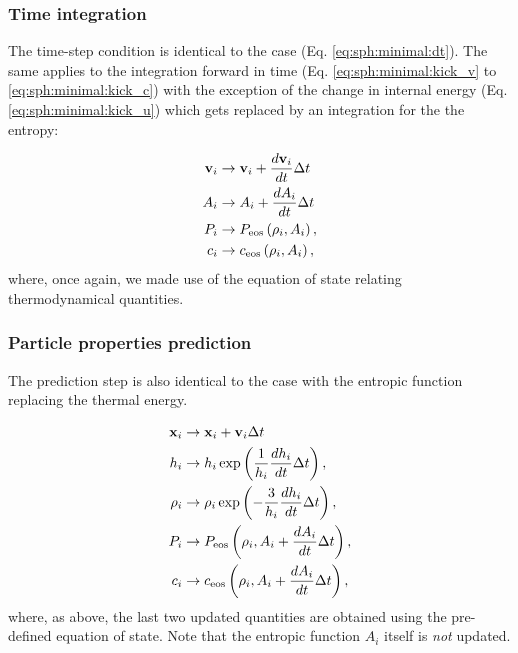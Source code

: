 \subsubsection{Time integration}

The time-step condition is identical to the \MinimalSPH case
(Eq. \ref{eq:sph:minimal:dt}). The same applies to the integration
forward in time (Eq. \ref{eq:sph:minimal:kick_v} to
\ref{eq:sph:minimal:kick_c}) with the exception of the change in
internal energy (Eq. \ref{eq:sph:minimal:kick_u}) which gets replaced
by an integration for the the entropy:


\begin{align}
  \vec{v}_i &\rightarrow \vec{v}_i + \frac{d\vec{v}_i}{dt} \Delta t  \label{eq:sph:gadget2:kick_v}\\
  A_i &\rightarrow A_i + \frac{dA_i}{dt} \Delta t \label{eq:sph:gadget2:kick_A}\\
  P_i &\rightarrow P_{\rm eos}\left(\rho_i, A_i\right) \label{eq:sph:gadget2:kick_P}, \\
  c_i &\rightarrow c_{\rm eos}\left(\rho_i, A_i\right) \label{eq:sph:gadget2:kick_c},
\end{align}
where, once again, we made use of the equation of state relating
thermodynamical quantities.

\subsubsection{Particle properties prediction}

The prediction step is also identical to the \MinimalSPH case with the
entropic function replacing the thermal energy.

\begin{align}
  \vec{x}_i &\rightarrow \vec{x}_i + \vec{v}_i \Delta t  \label{eq:sph:gadget2:drift_x} \\
  h_i &\rightarrow h_i \exp\left(\frac{1}{h_i} \frac{dh_i}{dt}
  \Delta t\right), \label{eq:sph:gadget2:drift_h}\\
  \rho_i &\rightarrow \rho_i \exp\left(-\frac{3}{h_i} \frac{dh_i}{dt}
  \Delta t\right), \label{eq:sph:gadget2:drift_rho} \\
  P_i &\rightarrow P_{\rm eos}\left(\rho_i, A_i + \frac{dA_i}{dt} \Delta t\right), \label{eq:sph:gadget2:drift_P}\\
  c_i &\rightarrow c_{\rm eos}\left(\rho_i, A_i + \frac{dA_i}{dt}
  \Delta t\right) \label{eq:sph:gadget2:drift_c},
\end{align}
where, as above, the last two updated quantities are obtained using
the pre-defined equation of state. Note that the entropic function $A_i$
itself is \emph{not} updated.



